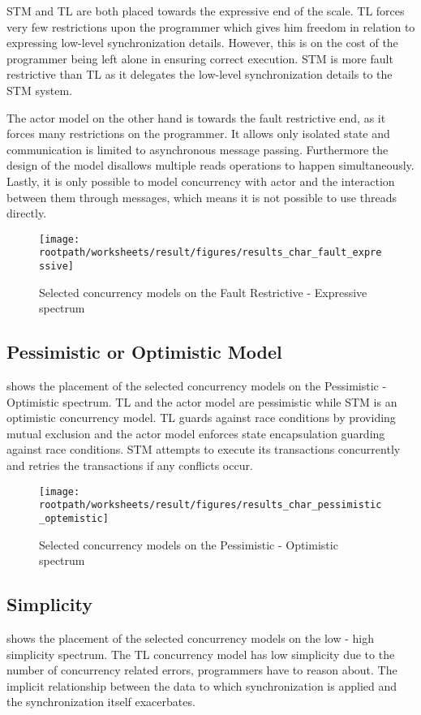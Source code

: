 \ac{STM} and \ac{TL} are both placed towards the expressive end of the scale. \ac{TL} forces very few restrictions upon the programmer which gives him freedom in relation to expressing low-level synchronization details. However, this is on the cost of the programmer being left alone in ensuring correct execution. \ac{STM} is more fault restrictive than \ac{TL} as it delegates the low-level synchronization details to the STM system. 

The actor model on the other hand is towards the fault restrictive end, as it forces many restrictions on the programmer. It allows only isolated state and communication is limited to asynchronous message passing. Furthermore the design of the model disallows multiple reads operations to happen simultaneously. Lastly, it is only possible to model concurrency with actor and the interaction between them through messages, which means it is not possible to use threads directly.

\begin{figure}[htbp]
\centering
 \texttt{[image: \\rootpath/worksheets/result/figures/results\_char\_fault\_expressive]} 
 \caption{Selected concurrency models on the Fault Restrictive - Expressive spectrum}
\label{fig:results_char_fault_expressive}
\end{figure}

\subsection{Pessimistic or Optimistic Model}
 shows the placement of the selected concurrency models on the Pessimistic - Optimistic spectrum. \ac{TL} and the actor model are pessimistic while \ac{STM} is an optimistic concurrency model. \ac{TL} guards against race conditions by providing mutual exclusion and the actor model enforces state encapsulation guarding against race conditions. \ac{STM} attempts to execute its transactions concurrently and retries the transactions if any conflicts occur.

\begin{figure}[htbp]
\centering
 \texttt{[image: \\rootpath/worksheets/result/figures/results\_char\_pessimistic\_optemistic]} 
 \caption{Selected concurrency models on the Pessimistic - Optimistic spectrum}
\label{fig:results_char_pes_opti}
\end{figure}

\subsection{Simplicity}
 shows the placement of the selected concurrency models on the low - high simplicity spectrum. The \ac{TL} concurrency model has low simplicity due to the number of concurrency related errors, programmers have to reason about. The implicit relationship between the data to which synchronization is applied and the synchronization itself exacerbates.


